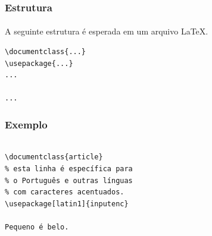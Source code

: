 \begin{frame}[fragile]
\frametitle{Estrutura}
\framesubtitle{}
  A seguinte estrutura é esperada em um arquivo \LaTeX{}.

\begin{verbatim}
\documentclass{...}
\usepackage{...}
...

...

\end{verbatim}
\end{frame}

\begin{frame}[fragile]
\frametitle{Exemplo}
\framesubtitle{}
  \scriptsize
  \begin{columns}[c]
\begin{verbatim}
\documentclass{article}
% esta linha é específica para
% o Português e outras línguas
% com caracteres acentuados.
\usepackage[latin1]{inputenc}

Pequeno é belo.

\end{verbatim}
  \vspace{-0.3cm}
  \begin{figure}[h!]
  \centering
  \setlength\fboxsep{0pt}
  \setlength\fboxrule{0.5pt}
  \label{fig:minimal}
  \end{figure}
  \end{columns}
\end{frame}

